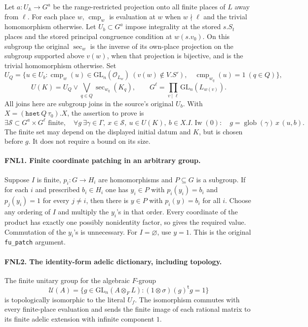 \documentclass[11pt,a4paper]{article}
\numberwithin{equation}{section}
\theoremstyle{remark}\newtheorem{remark}[theorem]{Remark}
\begin{document}
Let \(a:U_{\mathbb A}\to G^a\) be the range-restricted projection onto
all finite places of \(L\) away from \(\ell\).  For each place \(w\),
\(\operatorname{cmp}_w\) is evaluation at \(w\) when \(w\nmid\ell\)
and the trivial homomorphism otherwise.  Let \(U_b\subset G^a\) impose
integrality at the stored \(s.S_t\) places and the stored principal
congruence condition at \(w(s.v_0)\).  On this subgroup the original
\(\operatorname{sec}_w\) is the inverse of its own-place projection
on the subgroup supported above \(v(w)\), when that projection is
bijective, and is the trivial homomorphism otherwise.  Set
\[
 U_Q=\{u\in U_b:\operatorname{cmp}_w(u)\in\mathrm{GL}_n(\mathcal O_{L_w})
      \ (v(w)\notin V.S'),\quad
      \operatorname{cmp}_{w_q}(u)=1\ (q\in Q)\},
\]
\[
 U(K)=U_Q\vee\bigvee_{q\in Q}\operatorname{sec}_{w_q}(K_q),\qquad
 G^\ell=\prod_{v\mid\ell}\mathrm{GL}_n(L_{w(v)}).
\]
All joins here are subgroup joins in the source's original \(U_b\).
With \(X=(\texttt{hset}\,\allowbreak{} Q\,\tau_0).X\), the assertion to prove is
\begin{equation}\label{eq:fnl-target}
 \exists\mathcal S\subset G^a\times G^\ell\text{ finite},\quad
 \forall g\ \exists\gamma\in\Gamma,\ x\in\mathcal S,\ u\in U(K),\
 b\in X.I.\operatorname{Iw}(0):\quad
             g=\operatorname{glob}(\gamma)\,\allowbreak{} x\,(u,\allowbreak{} b).
\end{equation}
The finite set may depend on the displayed initial datum and \(K\), but
is chosen before \(g\).  It does not require a bound on its size.

\paragraph{FNL1. Finite coordinate patching in an arbitrary group.}
\label{claim:FNL1}
Suppose \(I\) is finite, \(p_i:G\to H_i\) are homomorphisms and
\(P\subseteq G\) is a subgroup.  If for each \(i\) and prescribed
\(b_i\in H_i\) one has \(y_i\in P\) with
\(p_i(y_i)=b_i\) and \(p_j(y_i)=1\) for every \(j\ne i\), then there
is \(y\in P\) with \(p_i(y)=b_i\) for all \(i\).
Choose any ordering of \(I\) and multiply the \(y_i\)'s in that order.
Every coordinate of the product has exactly one possibly nonidentity
factor, so gives the required value.  Commutation of the \(y_i\)'s is
unnecessary.  For \(I=\varnothing\), use \(y=1\).
This is the original \texttt{fu\_\allowbreak patch} argument.

\paragraph{FNL2. The identity-form adelic dictionary, including topology.}
\label{claim:FNL2}
The finite unitary group for the algebraic \(F\)-group
\[
 \mathcal U(A)=\{g\in\mathrm{GL}_n(A\otimes_F L):
                     (1\otimes\sigma)(g)^{\mathsf t}g=1\}
\]
is topologically isomorphic to the literal \(U_f\).  The isomorphism
commutes with every finite-place evaluation and sends the finite image of
each rational matrix to its finite adelic extension with infinite
component \(1\).
\end{document}
